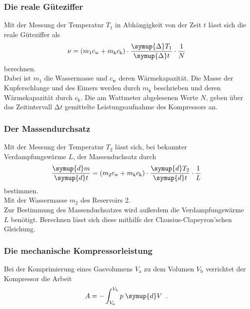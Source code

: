 \subsubsection{Die reale Güteziffer}
Mit der Messung der Temperatur $T_1$ in Abhängigkeit von der Zeit $t$ lässt sich die reale Güteziffer als 
\begin{equation}
    \nu = (m_1 c_\text{w} + m_\text{k} c_\text{k})\cdot 
    \frac{\symup{\Delta} T_1}{\symup{\Delta} t} \cdot \frac{1}{N}
    \label{eqn:Güteziffer}
\end{equation}
berechnen.\\
Dabei ist $m_1$ die Wassermasse und $c_\text{w}$ deren Wärmekapazität. Die Masse der Kupferschlange und des Eimers werden durch $m_\text{k}$ beschrieben und deren Wärmekapazität
durch $c_\text{k}$. Die am Wattmeter abgelesenen Werte $N$, geben über das Zeitintervall $\increment t$ gemittelte Leistungsaufnahme des Kompressors an.

\subsubsection{Der Massendurchsatz}
Mit der Messung der Temperatur $T_2$ lässt sich, bei bekannter Verdampfungswärme $L$, der Massenduchsatz durch\\
\begin{equation}
    \frac{\symup{d} m}{\symup{d}t} = (m_2 c_\text{w} + m_\text{k} c_\text{k}) \cdot 
    \frac{\symup{d} T_2}{\symup{d}t} \cdot  \frac{1}{L}
    \label{eqn:Massendurchsatz}
\end{equation}
bestimmen.\\
Mit der Wassermasse $m_2$ des Reservoirs 2.\\
Zur Bestimmung des Massenduchsatzes wird außerdem die Verdampfungswärme $L$ benötigt.
Berechnen lässt sich diese mithilfe der Clausius-Clapeyron'schen Gleichung.

\subsubsection{Die mechanische Kompressorleistung}
Bei der Komprimierung eines Gasvolumens $V_\text{a}$ zu dem Volumen $V_\text{b}$ 
verrichtet der Kompressor die Arbeit
\begin{equation}
    A = - \int^{V_\text{b}}_{V_\text{a}} p \; \symup{d}V \; \; \text{.}
\end{equation}
